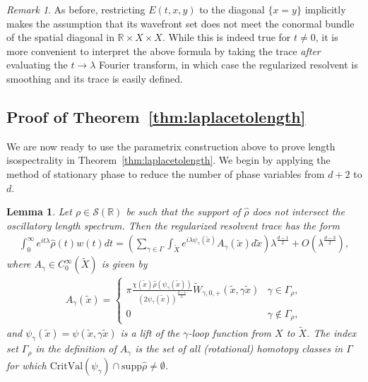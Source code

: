 \documentclass[11pt,letterpaper,oneside]{amsart}
\newcommand{\R}{\mathbb{R}}
\newcommand{\supp}{\text{supp}}
\newtheorem{lemm}[theo]{Lemma}
\theoremstyle{definition}
\theoremstyle{remark}
\newtheorem{rema}[theo]{Remark}
\newcommand{\wt}{\widetilde}
\newcommand{\wh}{\widehat}
\theoremstyle{definition}
\theoremstyle{remark}
\begin{document}
\begin{rema}\label{resolvent 2}
    As before, restricting $E(t,x,y)$ to the diagonal $\{x = y\}$ implicitly makes the assumption that its wavefront set does not meet the conormal bundle of the spatial diagonal in $\R \times X \times X$. While this is indeed true for $t \neq 0$, it is more convenient to interpret the above formula by taking the trace \textit{after} evaluating the $t \to \lambda$ Fourier transform, in which case the regularized resolvent is smoothing and its trace is easily defined.
\end{rema}
	
\subsection{Proof of Theorem~\ref{thm:laplacetolength}} \label{subsec:laplacetolength} We are now ready to use the parametrix construction above to prove length isospectrality in Theorem~\ref{thm:laplacetolength}. We begin by applying the method of stationary phase to reduce the number of phase variables from $d+ 2$ to $d$.


\begin{lemm}\label{Regularized resolvent}
    Let $\rho \in \mathscr{S}(\R)$ be such that the support of $\wh \rho$ does not intersect the oscillatory length spectrum. Then the regularized resolvent trace has the form
        \begin{align*}
        \int_0^\infty e^{i t \lambda} \wh \rho(t) w(t) dt = \left(\sum_{\gamma \in \Gamma} \int_{\wt X} e^{i \lambda \psi_{\gamma}(\wt x)} A_\gamma(\wt x) d \wt x \right) \lambda^{\frac{d-1}{2}}  + O(\lambda^{\frac{d-3}{2}}),
    \end{align*}
    where $A_\gamma \in C_0^\infty(\wt X)$ is given by
    \begin{align*}
        A_\gamma(\wt x) =
        \begin{cases}
            \pi \frac{\chi(\wt x) \wh \rho(\psi_\gamma(\wt x))}{\left(2 \psi_\gamma (\wt x)\right)^{\frac{d- 1}{2} }} \wt W_{\gamma, 0,+}(\wt x, \gamma \wt x) & \gamma \in \Gamma_\rho,\\
            0 & \gamma \notin \Gamma_\rho,
        \end{cases}
    \end{align*}
    and $\psi_\gamma(\wt x) = \psi(\wt x, \gamma \wt x)$ is a lift of the $\gamma$-loop function from $X$ to $\wt X$. The index set $\Gamma_\rho$ in the definition of $A_\gamma$ is the set of all (rotational) homotopy classes in $\Gamma$ for which $\text{CritVal} (\psi_\gamma) \cap \supp \wh \rho \neq \emptyset$.
\end{lemm}
\end{document}
